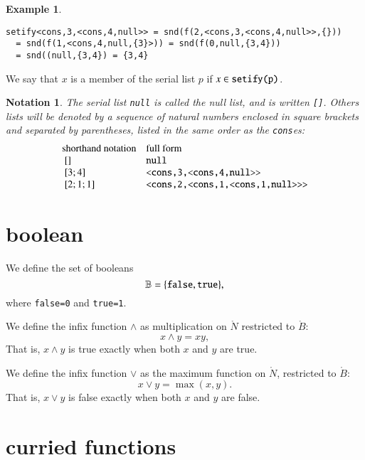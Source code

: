 \documentclass[cup9a]{cupbook}
\newtheorem{example}{Example}[chapter]
\newtheorem{notation}{Notation}[chapter]
\begin{document}
\begin{example}
\begin{verbatim}
setify<cons,3,<cons,4,null>> = snd(f(2,<cons,3,<cons,4,null>>,{})) 
  = snd(f(1,<cons,4,null,{3}>)) = snd(f(0,null,{3,4})) 
  = snd((null,{3,4}) = {3,4}
\end{verbatim}
\end{example}

We say that $x$ is a member of the serial list $p$ if $x\in\verb!setify(p)!$.


\begin{notation} The serial list \verb!null! is called the null list, and is written \verb![]!.  Others lists will be denoted by a sequence of natural numbers enclosed in square brackets and separated by parentheses, listed in the same order as the \verb!cons!es:
$$
\begin{array}{lll}
\hbox{shorthand notation} & \hbox{full form}\\
~[]&\verb!null!\\
~[3;4]&\verb!<cons,3,<cons,4,null>>!\\
~[2;1;1]&\verb!<cons,2,<cons,1,<cons,1,null>>>!\\
\end{array}
$$
\end{notation}









\section{boolean}

We define the set of booleans
$$
\ring{B} = \{\verb!false!,\verb!true!\},
$$
where \verb!false=0! and \verb!true=1!.

We define the infix function $\land$ 
as multiplication on $\ring{N}$ restricted to $\ring{B}$:
$$
x \land y = x y,
$$
That is, $x\land y$ is true exactly when both $x$ and $y$
are true.

We define the infix function $\lor$ as the maximum
function on $\ring{N}$, restricted to $\ring{B}$:
$$
x\lor y = \max(x,y).
$$
That is, $x\lor y$ is false exactly when both $x$ and $y$ are false.

\section{curried functions}
\end{document}
